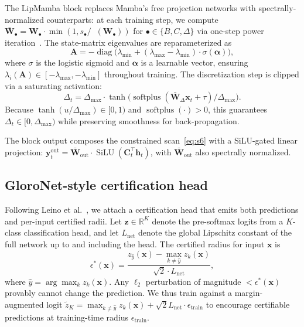 \documentclass[journal,a4paper,10pt]{IEEEtran}
\theoremstyle{definition}
\theoremstyle{remark}
\newcommand{\modelname}{LipMamba}
\newcommand{\R}{\mathbb{R}}
\DeclareMathOperator{\softplus}{softplus}
\DeclareMathOperator{\diag}{diag}
\DeclareMathOperator{\sigmamax}{\sigma_{max}}
\DeclareMathOperator{\SiLU}{SiLU}
\begin{document}
The \modelname{} block replaces Mamba's free projection networks with spectrally-normalized counterparts: at each training step, we compute $\bar{\mathbf{W}}_\bullet = \mathbf{W}_\bullet \cdot \min(1, s_\bullet / \sigmamax(\mathbf{W}_\bullet))$ for $\bullet \in \{B, C, \Delta\}$ via one-step power iteration~\cite{miyato2018spectral}. The state-matrix eigenvalues are reparameterized as
\begin{equation}
    \mathbf{A} = -\diag\bigl(\lambda_{\min} + (\lambda_{\max} - \lambda_{\min}) \cdot \sigma(\bm{\alpha})\bigr),
    \label{eq:eigreparam}
\end{equation}
where $\sigma$ is the logistic sigmoid and $\bm{\alpha}$ is a learnable vector, ensuring $\lambda_i(\mathbf{A}) \in [-\lambda_{\max}, -\lambda_{\min}]$ throughout training. The discretization step is clipped via a saturating activation:
\begin{equation}
    \Delta_t = \Delta_{\max} \cdot \tanh\bigl(\softplus(\bar{\mathbf{W}}_\Delta \mathbf{x}_t + \tau) / \Delta_{\max}\bigr).
    \label{eq:deltaclip}
\end{equation}
Because $\tanh(u/\Delta_{\max}) \in [0, 1)$ and $\softplus(\cdot) > 0$, this guarantees $\Delta_t \in [0, \Delta_{\max})$ while preserving smoothness for back-propagation.

The block output composes the constrained scan~\eqref{eq:s6} with a SiLU-gated linear projection: $\mathbf{y}_t^{\mathrm{out}} = \bar{\mathbf{W}}_{\mathrm{out}} \cdot \SiLU(\mathbf{C}_t^\top \mathbf{h}_t)$, with $\bar{\mathbf{W}}_{\mathrm{out}}$ also spectrally normalized.

\subsection{GloroNet-style certification head}
\label{subsec:head}

Following Leino et al.~\cite{leino2021globally}, we attach a certification head that emits both predictions and per-input certified radii. Let $\bm{z} \in \R^K$ denote the pre-softmax logits from a $K$-class classification head, and let $L_{\mathrm{net}}$ denote the global Lipschitz constant of the full network up to and including the head. The certified radius for input $\mathbf{x}$ is
\begin{equation}
    \epsilon^*(\mathbf{x}) = \frac{z_{\hat{y}}(\mathbf{x}) - \max_{k \neq \hat{y}} z_k(\mathbf{x})}{\sqrt{2} \cdot L_{\mathrm{net}}},
    \label{eq:gloro}
\end{equation}
where $\hat{y} = \arg\max_k z_k(\mathbf{x})$. Any $\ell_2$ perturbation of magnitude $< \epsilon^*(\mathbf{x})$ provably cannot change the prediction. We thus train against a margin-augmented logit $\tilde{z}_K = \max_{k \neq \hat{y}} z_k(\mathbf{x}) + \sqrt{2} L_{\mathrm{net}} \cdot \epsilon_{\mathrm{train}}$ to encourage certifiable predictions at training-time radius $\epsilon_{\mathrm{train}}$.
\end{document}
